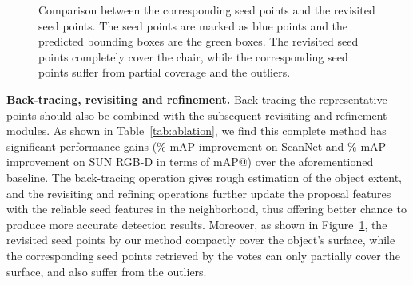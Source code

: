 \documentclass[final]{cvpr}
\begin{document}
\begin{table}[t]
\centering
\caption{Quantitative ablation experiments on ScanNet V2 and SUN RGB-D datasets. ``+CA-Reg'' means VoteNet~\cite{votenet} with a class-agnostic bounding box regressor, ``+Seed-Pts'' indicates VoteNet with votes fused with their corresponding seed points.}
\label{tab:ablation}
\vspace{+1mm}
\vspace{-2mm}
\end{table}

\begin{figure}[t]
    \centering
    \caption{
    Comparison between the corresponding seed points and the revisited seed points. 
The seed points are marked as blue points and the predicted bounding boxes are the green boxes. 
The revisited seed points completely cover the chair, while the corresponding seed points suffer from partial coverage and the outliers.
    }
    \vspace{-3mm}
    \label{fig:revisited-seed-points}
\end{figure}

\vspace{+1mm}
\noindent\textbf{Back-tracing, revisiting and refinement.}
Back-tracing the representative points should also be combined with the subsequent revisiting and refinement modules.
As shown in Table~\ref{tab:ablation}, we find this complete method has significant performance gains (\% mAP improvement on ScanNet and \% mAP improvement on SUN RGB-D in terms of mAP@) over the aforementioned baseline.
The back-tracing operation gives rough estimation of the object extent, and the revisiting and refining operations further update the proposal features with the reliable seed features in the neighborhood, thus offering better chance to produce more accurate detection results.
Moreover, as shown in Figure~\ref{fig:revisited-seed-points}, the revisited seed points by our method compactly cover the object's surface, while the corresponding seed points retrieved by the votes can only partially cover the surface, and also suffer from the outliers. 
\end{document}
